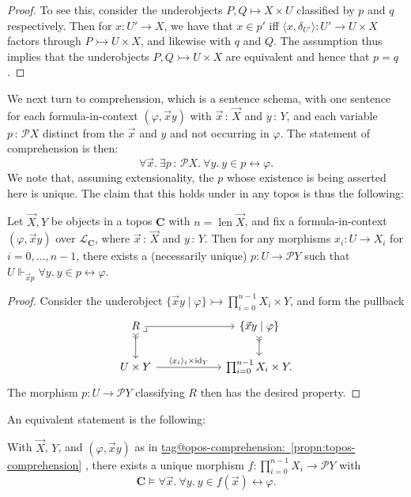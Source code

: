 \documentclass{amsart}
\makeatletter
\newcommand\bC{\mathbf{C}}
\newcommand\br[1]{\langle{}#1\rangle{}}
\newcommand\cL{\mathcal{L}}
\newcommand\id{\mathrm{id}}
\newcommand\len{\operatorname{len}}
\newcommand\pb[1][rd]{\ar[#1, phantom, "\lrcorner", pos=0]}
\renewcommand\phi{\varphi}
\newcommand\pow{\mathcal{P}}
\newcommand\set[2][]{#1\{ #2 #1\}}
\newcommand\tolon{{\,:\,}}
\newcommand\tot{\leftrightarrow}
\newcommand\tto{\rightarrowtail}
\newcommand\vek[1]{{\vec{#1}}}
\newcommand\vx{\vek{x}}
\newcommand\vX{\vek{X}}
\newcommand\tagword[1]{\csname tag@#1\endcsname}
\def\label@tag#1:#2\@nil{#1}
\newcommand\labeltag[1]{\label@tag#1:\@nil}
\newcommand\jref[1]{%
  \texorpdfstring%
    {\hyperref[#1]{\tagword{\labeltag{#1}}~\ref*{#1}}}%
    {\tagword{\labeltag{#1}}~\ref*{#1}}%
}
\theoremstyle{definition}
\theoremstyle{remark}
\theoremstyle{plainwithref}
\makeatother
\begin{document}
\begin{proof}
  To see this, consider the underobjects \( P,Q \mapsto X \times U \) classified by \( p \) and \( q \) respectively.
  Then for \( x \colon U' \to X \), we have that \( x \in p' \) iff \( \br{x,\delta_{U'}} \colon U' \to U \times X \) factors through \( P \tto U \times X \), and likewise with \( q \) and \( Q \).
  The assumption thus implies that the underobjects \( P, Q \tto U \times X \) are equivalent and hence that \( p = q \).
\end{proof}

We next turn to comprehension, which is a sentence schema, with one sentence for each formula-in-context \( (\phi, \vx y) \) with \( \vx \tolon \vX \) and \( y \tolon Y \), and each variable \( p \tolon \pow X \) distinct from the \( \vx \) and \( y \) and not occurring in \( \phi \).
The statement of comprehension is then:
\[
  \forall \vx.\ \exists p \tolon \pow X.\ \forall y.\ y \in p \tot \phi.
\]
We note that, assuming extensionality, the \( p \) whose existence is being asserted here is unique.
The claim that this holds under in any topos is thus the following:
\begin{propn} \label{propn:topos-comprehension}
  Let \( \vX,Y \) be objects in a topos \( \bC \) with \( n = \len \vX \), and fix a formula-in-context \( (\phi, \vx y) \) over \( \cL_\bC \), where \( \vx \tolon \vX \) and \( y \tolon Y \).
  Then for any morphisms \( x_i \colon U \to X_i \) for \( i = 0,\ldots,n - 1 \), there exists a (necessarily unique) \( p \colon U \to \pow Y \) such that \( U \Vdash_{\vx p} \forall y.\ y \in p \tot \phi \).
\end{propn}

\begin{proof}
  Consider the underobject \( \set{\vx y \mid \phi} \tto \prod_{i=0}^{n-1} X_i \times Y \), and form the pullback
  \[
    \begin{tikzcd}
      R \pb \ar[r, ""] \ar[d, >>->, ""'] &[35pt] \set{\vx y \mid \phi} \ar[d, "", >>->] \\
      U \times Y \ar[r, "\br{x_i}_{i} \times \id_Y"] & \prod_{i=0}^{n-1} X_i \times Y.
    \end{tikzcd}
  \]
  The morphism \( p \colon U \to \pow Y \) classifying \( R \) then has the desired property.
\end{proof}

An equivalent statement is the following:
\begin{propn} \label{propn:comprehension-morphism}
  With \( \vX \), \( Y \), and \( (\phi, \vx y) \) as in \jref{propn:topos-comprehension}, there exists a unique morphism \( f \colon \prod_{i=0}^{n-1} X_i \to \pow Y \) with
  \[
    \bC \vDash \forall \vx.\ \forall y .\ y \in f(\vx) \tot \phi.
  \]
\end{propn}
\end{document}
